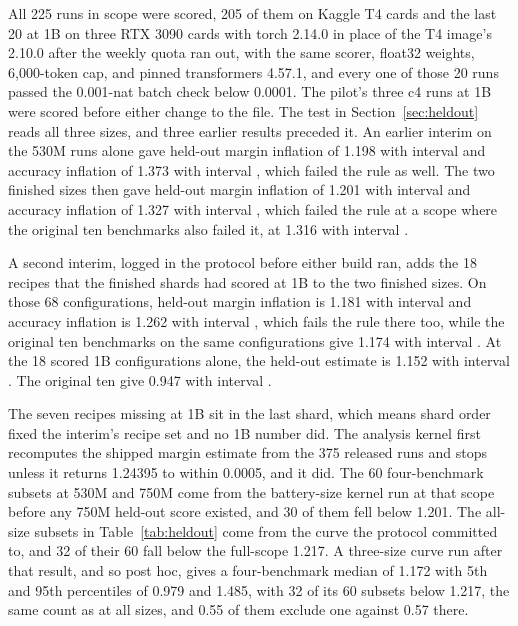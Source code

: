 All 225 runs in scope were scored, 205 of them on Kaggle T4 cards and the last 20 at 1B on three RTX 3090 cards with torch 2.14.0 in place of the T4 image's 2.10.0 after the weekly quota ran out, with the same scorer, float32 weights, 6,000-token cap, and pinned transformers 4.57.1, and every one of those 20 runs passed the 0.001-nat batch check below 0.0001. The pilot's three c4 runs at 1B were scored before either change to the file. The test in Section~\ref{sec:heldout} reads all three sizes, and three earlier results preceded it. An earlier interim on the 530M runs alone gave held-out margin inflation of 1.198 with interval  and accuracy inflation of 1.373 with interval , which failed the rule as well. The two finished sizes then gave held-out margin inflation of 1.201 with interval  and accuracy inflation of 1.327 with interval , which failed the rule at a scope where the original ten benchmarks also failed it, at 1.316 with interval .

A second interim, logged in the protocol before either build ran, adds the 18 recipes that the finished shards had scored at 1B to the two finished sizes. On those 68 configurations, held-out margin inflation is 1.181 with interval  and accuracy inflation is 1.262 with interval , which fails the rule there too, while the original ten benchmarks on the same configurations give 1.174 with interval . At the 18 scored 1B configurations alone, the held-out estimate is 1.152 with interval . The original ten give 0.947 with interval .

The seven recipes missing at 1B sit in the last shard, which means shard order fixed the interim's recipe set and no 1B number did. The analysis kernel first recomputes the shipped margin estimate from the 375 released runs and stops unless it returns 1.24395 to within 0.0005, and it did. The 60 four-benchmark subsets at 530M and 750M come from the battery-size kernel run at that scope before any 750M held-out score existed, and 30 of them fell below 1.201. The all-size subsets in Table~\ref{tab:heldout} come from the curve the protocol committed to, and 32 of their 60 fall below the full-scope 1.217. A three-size curve run after that result, and so post hoc, gives a four-benchmark median of 1.172 with 5th and 95th percentiles of 0.979 and 1.485, with 32 of its 60 subsets below 1.217, the same count as at all sizes, and 0.55 of them exclude one against 0.57 there.

